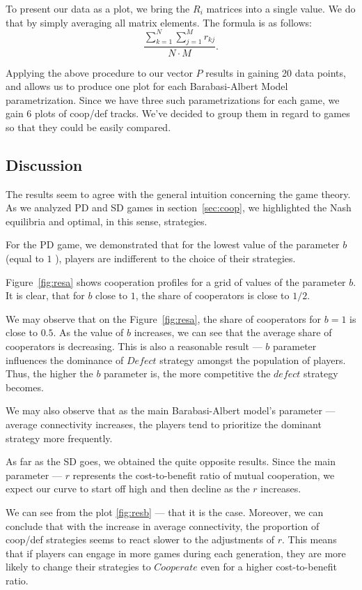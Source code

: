 \documentclass[english, twoside, 12pt, a4paper]{article}
\theoremstyle{definition}
\theoremstyle{plain}
\theoremstyle{remark}
\begin{document}
To present our data as a plot, we bring the $R_i$ matrices into a single value. We do that by simply averaging all matrix elements. The formula is as follows:
\[
  \frac{\sum_{k=1}^{N}\sum_{j=1}^{M} r_{kj}}{N \cdot M} .
\] 

Applying the above procedure to our vector \( P\) results in gaining 20 data points, and allows us to produce one plot for each Barabasi-Albert Model parametrization. Since we have three such parametrizations for each game, we gain 6 plots of coop/def tracks. We've decided to group them in regard to games so that they could be easily compared. 

\subsection{Discussion}

The results seem to agree with the general intuition concerning the game theory. As we analyzed PD and SD games in section~\ref{sec:coop}, we highlighted the Nash equilibria and optimal, in this sense, strategies. 

For the PD game, we demonstrated that for the lowest value of the parameter $b$ (equal to \( 1\) ), players are indifferent to the choice of their strategies. 

Figure~\ref{fig:resa} shows cooperation profiles for a grid of values of the parameter \( b\). It is clear, that for \( b\) close to \(1\), the share of cooperators is close to \(1/2\). 

We may observe that on the Figure~\ref{fig:resa}, the share of cooperators for $b=1$ is close to $0.5$. As the value of $b$ increases, we can see that the average share of cooperators is decreasing. This is also a reasonable result --- $b$ parameter influences the dominance of $Defect$ strategy amongst the population of players. Thus, the higher the $b$ parameter is, the more competitive the $defect$ strategy becomes. 

We may also observe that as the main Barabasi-Albert model's parameter --- average connectivity increases, the players tend to prioritize the dominant strategy more frequently. 

As far as the SD goes, we obtained the quite opposite results. Since the main parameter --- $r$ represents the cost-to-benefit ratio of mutual cooperation, we expect our curve to start off high and then decline as the $r$ increases. 

We can see from the plot \ref{fig:resb} --- that it is the case. Moreover, we can conclude that with the increase in average connectivity, the proportion of coop/def strategies seems to react slower to the adjustments of $r$. This means that if players can engage in more games during each generation, they are more likely to change their strategies to $Cooperate$ even for a higher cost-to-benefit ratio. 
\end{document}
